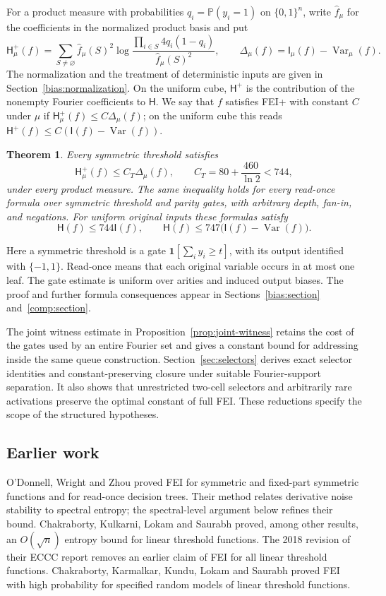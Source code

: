\documentclass[11pt]{amsart}
\newtheorem{mainthm}{Theorem}
\theoremstyle{definition}
\theoremstyle{remark}
\renewcommand{\P}{\mathbb P}
\newcommand{\HH}{\mathsf H}
\newcommand{\I}{\mathsf I}
\DeclareMathOperator{\Var}{Var}
\newcommand{\wh}[1]{\widehat{#1}}
\begin{document}
For a product measure with probabilities $q_i=\P(y_i=1)$ on $\{0,1\}^n$, write $\wh f_\mu$ for the coefficients in the normalized product basis and put
\[
 \HH_\mu^+(f)=\sum_{S\ne\varnothing}\wh f_\mu(S)^2
    \log\frac{\prod_{i\in S}4q_i(1-q_i)}{\wh f_\mu(S)^2},
 \qquad
 \Delta_\mu(f)=\I_\mu(f)-\Var_\mu(f).
\]
The normalization and the treatment of deterministic inputs are given in Section~\ref{bias:normalization}. On the uniform cube, $\HH^+$ is the contribution of the nonempty Fourier coefficients to $\HH$. We say that $f$ satisfies FEI+ with constant $C$ under $\mu$ if $\HH_\mu^+(f)\le C\Delta_\mu(f)$; on the uniform cube this reads $\HH^+(f)\le C(\I(f)-\Var(f))$.

\begin{mainthm}\label{thm:formulas-intro}
Every symmetric threshold satisfies
\[
 \HH_\mu^+(f)\le C_T\Delta_\mu(f),
 \qquad C_T=80+\frac{460}{\ln2}<744,
\]
under every product measure. The same inequality holds for every read-once formula over symmetric threshold and parity gates, with arbitrary depth, fan-in, and negations. For uniform original inputs these formulas satisfy
\[
 \HH(f)\le744\I(f),\qquad
 \HH(f)\le747\bigl(\I(f)-\Var(f)\bigr).
\]
\end{mainthm}

Here a symmetric threshold is a gate $\mathbf1[\sum_i y_i\ge t]$, with its output identified with $\{-1,1\}$. Read-once means that each original variable occurs in at most one leaf. The gate estimate is uniform over arities and induced output biases. The proof and further formula consequences appear in Sections~\ref{bias:section} and~\ref{comp:section}.


The joint witness estimate in Proposition~\ref{prop:joint-witness}
retains the cost of the gates used by an entire Fourier set and gives a
constant bound for addressing inside the same queue construction.
Section~\ref{sec:selectors} derives exact selector identities and
constant-preserving closure under suitable Fourier-support separation.
It also shows that unrestricted two-cell selectors and arbitrarily
rare activations preserve the optimal constant of full FEI. These
reductions specify the scope of the structured hypotheses.

\subsection{Earlier work}

O'Donnell, Wright and Zhou \cite{OWZ11} proved FEI for symmetric and fixed-part symmetric functions and for read-once decision trees. Their method relates derivative noise stability to spectral entropy; the spectral-level argument below refines their bound. Chakraborty, Kulkarni, Lokam and Saurabh \cite{CKLS16} proved, among other results, an $O(\sqrt n)$ entropy bound for linear threshold functions. The 2018 revision of their ECCC report removes an earlier claim of FEI for all linear threshold functions. Chakraborty, Karmalkar, Kundu, Lokam and Saurabh \cite{CKKLS18} proved FEI with high probability for specified random models of linear threshold functions.
\end{document}
